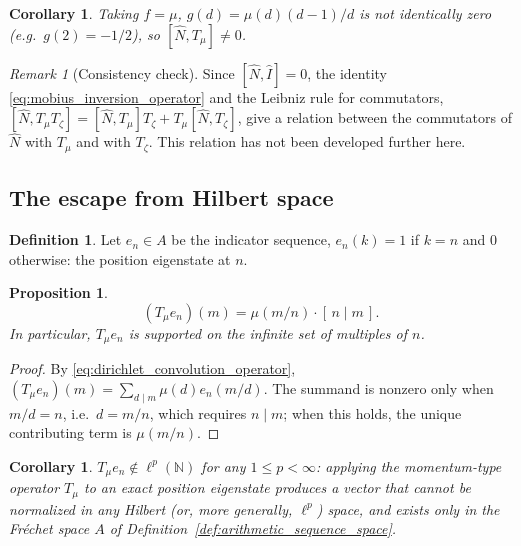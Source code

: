 \documentclass[11pt]{amsart}
\numberwithin{equation}{section}
\theoremstyle{plain}
\newtheorem{proposition}[theorem]{Proposition}
\newtheorem{corollary}[theorem]{Corollary}
\theoremstyle{definition}
\newtheorem{definition}[theorem]{Definition}
\theoremstyle{remark}
\newtheorem{remark}[theorem]{Remark}
\newcommand{\N}{\mathbb{N}}
\begin{document}
\begin{corollary}
\label{cor:mobius_commutator_nonzero}
Taking $f=\mu$, $g(d)=\mu(d)(d-1)/d$ is not identically zero (e.g.\
$g(2)=-1/2$), so $[\hat N,T_\mu]\neq0$.
\end{corollary}

\begin{remark}[Consistency check]
\label{rem:leibniz_consistency}
Since $[\hat N,\hat I]=0$, the identity
\eqref{eq:mobius_inversion_operator} and the Leibniz rule for
commutators, $[\hat N, T_\mu T_\zeta] = [\hat N,T_\mu]T_\zeta + T_\mu[\hat N,T_\zeta]$,
give a relation between the commutators of $\hat N$ with $T_\mu$ and
with $T_\zeta$. This relation has not been developed further here.
\end{remark}

\subsection{The escape from Hilbert space}
\label{subsec:non_hilbert_escape}

\begin{definition}
\label{def:indicator_sequence}
Let $e_n\in A$ be the indicator sequence, $e_n(k)=1$ if $k=n$ and $0$
otherwise: the position eigenstate at $n$.
\end{definition}

\begin{proposition}
\label{prop:infinite_support}
\begin{equation}
(T_\mu e_n)(m) = \mu(m/n)\cdot[\,n\mid m\,].
\label{eq:infinite_support}
\end{equation}
In particular, $T_\mu e_n$ is supported on the infinite set of
multiples of $n$.
\end{proposition}

\begin{proof}
By \eqref{eq:dirichlet_convolution_operator}, $(T_\mu e_n)(m)=\sum_{d\mid m}\mu(d)e_n(m/d)$.
The summand is nonzero only when $m/d=n$, i.e.\ $d=m/n$, which requires
$n\mid m$; when this holds, the unique contributing term is $\mu(m/n)$.
\end{proof}

\begin{corollary}
\label{cor:no_hilbert_space}
$T_\mu e_n\notin\ell^p(\N)$ for any $1\le p<\infty$: applying the
momentum-type operator $T_\mu$ to an exact position eigenstate
produces a vector that cannot be normalized in any Hilbert (or, more
generally, $\ell^p$) space, and exists only in the Fr\'echet space $A$
of Definition~\ref{def:arithmetic_sequence_space}.
\end{corollary}
\end{document}
